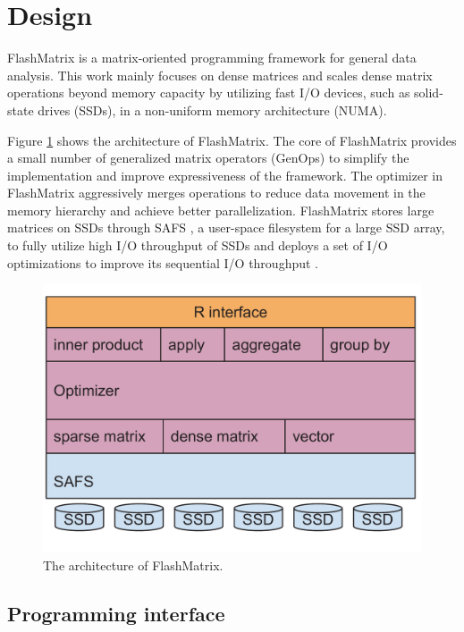 \section{Design}

FlashMatrix is a matrix-oriented programming framework for general data analysis.
This work mainly focuses on dense matrices and scales dense matrix operations
beyond memory capacity by utilizing fast I/O devices, such as solid-state drives
(SSDs), in a non-uniform memory architecture (NUMA).

Figure \ref{fig:arch} shows the architecture of FlashMatrix. The core of
FlashMatrix provides a small number of generalized matrix operators (GenOps)
to simplify the implementation and improve expressiveness of
the framework. The optimizer in FlashMatrix aggressively merges operations to
reduce data movement in the memory hierarchy and achieve better parallelization.
FlashMatrix stores large matrices on SSDs through SAFS \cite{safs},
a user-space filesystem for a large SSD array, to fully utilize high I/O
throughput of SSDs and deploys a set of I/O optimizations to improve
its sequential I/O throughput \cite{SEM_SpMM}.

\begin{figure}
\centering
\includegraphics[scale=0.3]{FlashMatrix_figs/architecture.pdf}
\caption{The architecture of FlashMatrix.}
\label{fig:arch}
\end{figure}

\subsection{Programming interface}

